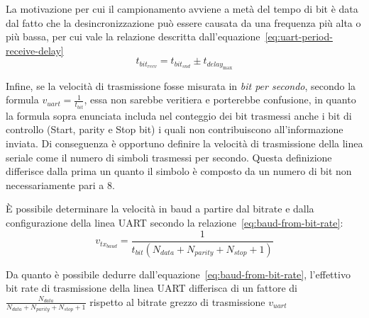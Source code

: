 
La motivazione per cui il campionamento avviene a metà del tempo di bit è data dal fatto che la desincronizzazione può essere causata da una frequenza più alta o più bassa, per cui vale la relazione descritta dall'equazione~\ref{eq:uart-period-receive-delay}
\begin{equation}\label{eq:uart-period-receive-delay}
     t_{bit_{recv}} = t_{bit_{snd}} \pm t_{delay_{\max}}
\end{equation}

Infine, se la velocità di trasmissione fosse misurata in \textit{bit per secondo}, secondo la formula \(v_{uart} = \frac{1}{t_{bit}}\), essa non sarebbe veritiera e porterebbe confusione, in quanto la formula sopra enunciata includa nel conteggio dei bit trasmessi anche i bit di controllo (Start, parity e Stop bit) i quali non contribuiscono all'informazione inviata. Di conseguenza è opportuno definire la velocità di trasmissione della linea seriale come il numero di simboli trasmessi per secondo. Questa definizione differisce dalla prima un quanto il simbolo è composto da un numero di bit non necessariamente pari a 8.

È possibile determinare la velocità in baud a partire dal bitrate e dalla configurazione della linea UART secondo la relazione~\ref{eq:baud-from-bit-rate}\cite{site:baud}:
\begin{equation}\label{eq:baud-from-bit-rate}
    v_{tx_{baud}} = \frac{1}{t_{bit}(N_{data} + N_{parity} + N_{stop} + 1)}
\end{equation}

Da quanto è possibile dedurre dall'equazione~\ref{eq:baud-from-bit-rate}, l'effettivo bit rate di trasmissione della linea UART differisca di un fattore di \(\frac{N_{data}}{N_{data} + N_{parity} + N_{stop} + 1}\) rispetto al bitrate grezzo di trasmissione \(v_{uart}\)

